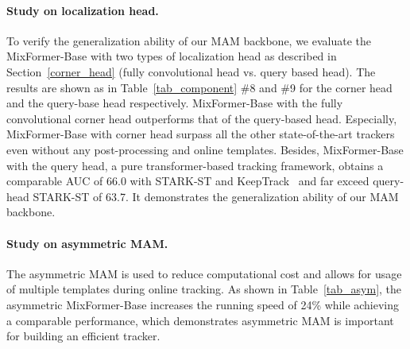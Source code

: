 \begin{table}[pt]
\small
    \centering
    \fontsize{6pt}{2.5mm}\selectfont
    \vspace{-2mm}
    \caption{Study on pretraining and training datasets. 'Whole' denotes for using the whole datasets including GOT-10k, LaSOT, TrackingNet and COCO.}
    \label{tab_data}
\vspace{-7mm}
\end{table}

\vspace{-4mm}
\paragraph{Study on localization head.}
To verify the generalization ability of our MAM backbone, we evaluate the MixFormer-Base with two types of localization head as described in Section~\ref{corner_head} (fully convolutional head vs. query based head). The results are shown as in Table~\ref{tab_component} \#8 and \#9 for the corner head and the query-base head respectively.
MixFormer-Base with the fully convolutional corner head outperforms that of the query-based head. Especially, MixFormer-Base with corner head surpass all the other state-of-the-art trackers even without any post-processing and online templates. 
Besides, MixFormer-Base with the query head, a pure transformer-based tracking framework, obtains a comparable AUC of 66.0 with STARK-ST and KeepTrack~\cite{keeptrack} and far exceed query-head STARK-ST of 63.7.
It demonstrates the generalization ability of our MAM backbone.
\vspace{-4mm}
\paragraph{Study on asymmetric MAM.}
The asymmetric MAM is used to reduce computational cost and allows for usage of multiple templates during online tracking. As shown in Table~\ref{tab_asym}, the asymmetric MixFormer-Base increases the running speed of 24\% while achieving a comparable performance, which demonstrates asymmetric MAM is important for building an efficient tracker.
\vspace{-4mm}
